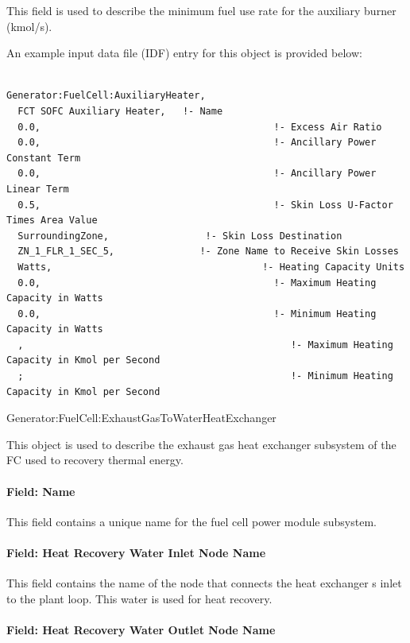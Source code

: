 This field is used to describe the minimum fuel use rate for the auxiliary burner (kmol/s).

An example input data file (IDF) entry for this object is provided below:

\begin{lstlisting}

Generator:FuelCell:AuxiliaryHeater,
  FCT SOFC Auxiliary Heater,   !- Name
  0.0,                                         !- Excess Air Ratio
  0.0,                                         !- Ancillary Power Constant Term
  0.0,                                         !- Ancillary Power Linear Term
  0.5,                                         !- Skin Loss U-Factor Times Area Value
  SurroundingZone,                 !- Skin Loss Destination
  ZN_1_FLR_1_SEC_5,               !- Zone Name to Receive Skin Losses
  Watts,                                     !- Heating Capacity Units
  0.0,                                         !- Maximum Heating Capacity in Watts
  0.0,                                         !- Minimum Heating Capacity in Watts
  ,                                               !- Maximum Heating Capacity in Kmol per Second
  ;                                               !- Minimum Heating Capacity in Kmol per Second
\end{lstlisting}

Generator:FuelCell:ExhaustGasToWaterHeatExchanger

This object is used to describe the exhaust gas heat exchanger subsystem of the FC used to recovery thermal energy.

\paragraph{Field: Name}\label{field-name-19-000}

This field contains a unique name for the fuel cell power module subsystem.

\paragraph{Field: Heat Recovery Water Inlet Node Name}\label{field-heat-recovery-water-inlet-node-name-2}

This field contains the name of the node that connects the heat exchanger s inlet to the plant loop. This water is used for heat recovery.

\paragraph{Field: Heat Recovery Water Outlet Node Name}\label{field-heat-recovery-water-outlet-node-name-1}

